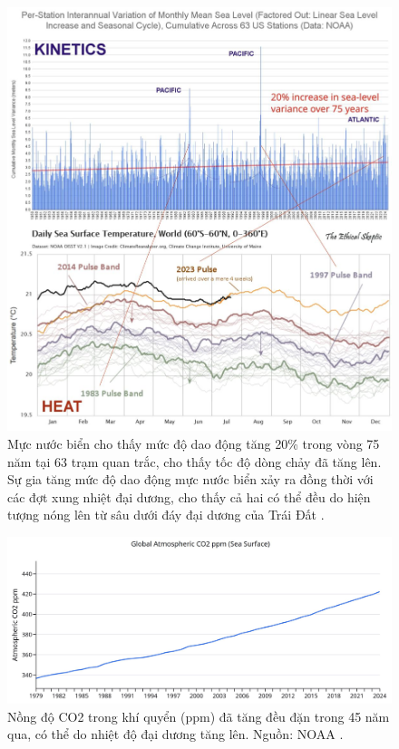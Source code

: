 \documentclass[10pt,twocolumn,letterpaper]{article}
\begin{document}
\begin{figure}[t]
\begin{center}
\includegraphics[width=1\textwidth]{sealevel.jpeg}
\end{center}
   \caption{Mực nước biển cho thấy mức độ dao động tăng 20\% trong vòng 75 năm tại 63 trạm quan trắc, cho thấy tốc độ dòng chảy đã tăng lên. Sự gia tăng mức độ dao động mực nước biển xảy ra đồng thời với các đợt xung nhiệt đại dương, cho thấy cả hai có thể đều do hiện tượng nóng lên từ sâu dưới đáy đại dương của Trái Đất \cite{2,129}.}
\label{fig:22}
\end{figure}

\begin{figure}[t]
\begin{center}
\includegraphics[width=1\textwidth]{co2.jpg}
\end{center}
   \caption{Nồng độ CO2 trong khí quyển (ppm) đã tăng đều đặn trong 45 năm qua, có thể do nhiệt độ đại dương tăng lên. Nguồn: NOAA \cite{148,129}.}
\label{fig:23}
\end{figure}
\end{document}
